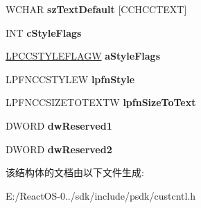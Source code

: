\begin{DoxyCompactItemize}
W\+C\+H\+AR {\bfseries sz\+Text\+Default} \mbox{[}C\+C\+H\+C\+C\+T\+E\+XT\mbox{]}
\item 
\mbox{\label{structtag_c_c_i_n_f_o_w_a25eeae5f8a234204c725362887a87bba}} 
I\+NT {\bfseries c\+Style\+Flags}
\item 
\mbox{\label{structtag_c_c_i_n_f_o_w_a37a97fed95c52cbce3e7ef2bee8c3bb3}} 
\hyperlink{structtag_c_c_s_t_y_l_e_f_l_a_g_w}{L\+P\+C\+C\+S\+T\+Y\+L\+E\+F\+L\+A\+GW} {\bfseries a\+Style\+Flags}
\item 
\mbox{\label{structtag_c_c_i_n_f_o_w_afaf2a19f52e1bf82d434cd555019a1b0}} 
L\+P\+F\+N\+C\+C\+S\+T\+Y\+L\+EW {\bfseries lpfn\+Style}
\item 
\mbox{\label{structtag_c_c_i_n_f_o_w_a55fa00f7f968b6139a676c3bd4254518}} 
L\+P\+F\+N\+C\+C\+S\+I\+Z\+E\+T\+O\+T\+E\+X\+TW {\bfseries lpfn\+Size\+To\+Text}
\item 
\mbox{\label{structtag_c_c_i_n_f_o_w_a635c65ab3786c8296f0b57639ff8a831}} 
D\+W\+O\+RD {\bfseries dw\+Reserved1}
\item 
\mbox{\label{structtag_c_c_i_n_f_o_w_a150cf02d808961f4c1717a41a2283a5f}} 
D\+W\+O\+RD {\bfseries dw\+Reserved2}
\end{DoxyCompactItemize}


该结构体的文档由以下文件生成\+:\begin{DoxyCompactItemize}
\item 
E\+:/\+React\+O\+S-\/0../sdk/include/psdk/custcntl.\+h\end{DoxyCompactItemize}
